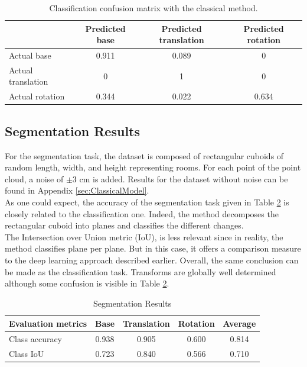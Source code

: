 \begin{table}[H]
        \begin{center}
                \begin{tabular}{|l||c|c|c|}
                        \hline 
                         & Predicted base & Predicted translation & Predicted rotation \\
                        \hline \hline
                        Actual base & 0.911 & 0.089 & 0 \\
                        \hline
                        Actual translation & 0 & 1 & 0 \\
                        \hline
                        Actual rotation & 0.344 & 0.022 & 0.634 \\
                        \hline
                \end{tabular}
        \end{center}
        \caption{Classification confusion matrix with the classical method.}
        \label{tab:cls_det_mat}
\end{table}
\subsection{Segmentation Results}
For the segmentation task, the dataset is composed of rectangular cuboids of random length, width, and height representing rooms. For each point of the point cloud, a noise of $\pm 3$ cm is added. Results for the dataset without noise can be found in Appendix \ref{sec:ClassicalModel}.\\

As one could expect, the accuracy of the segmentation task given in Table \ref{tab:seg_det_noise} is closely related to the classification one. Indeed, the method decomposes the rectangular cuboid into planes and classifies the different changes.\\

The Intersection over Union metric (IoU), is less relevant since in reality, the method classifies plane per plane. But in this case, it offers a comparison measure to the deep learning approach described earlier. Overall, the same conclusion can be made as the classification task. Transforms are globally well determined although some confusion is visible in Table \ref{tab:seg_det_noise}. 
\begin{table}[ht]
        \begin{center}
                \begin{tabular}{|l||c|c|c|c|}
                        \hline
                        Evaluation metrics & Base & Translation & Rotation & Average \\
                        \hline \hline
                        Class accuracy & 0.938 & 0.905 & 0.600 & 0.814 \\
                        \hline
                        Class IoU & 0.723 & 0.840 & 0.566 & 0.710 \\
                        \hline
                \end{tabular}
        \end{center}
        \caption{Segmentation Results}
        \label{tab:seg_det_noise}
\end{table}
